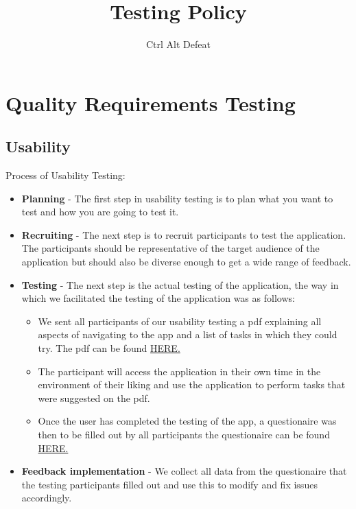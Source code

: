 \documentclass[12pt]{article}
\title{Testing Policy}
\author{Ctrl Alt Defeat}
\begin{document}

\tableofcontents
\newpage

\newpage
\section{Quality Requirements Testing}
\subsection{Usability}
Process of Usability Testing:
\begin{itemize}
    \item \textbf{Planning} - The first step in usability testing is to plan what you want to test and how you are going to test it.
    \item \textbf{Recruiting} - The next step is to recruit participants to test the application. The participants should be representative of the target audience of the application but should also be diverse enough to get a wide range of feedback.
    \item \textbf{Testing} - The next step is the actual testing of the application, the way in which we facilitated the testing of the application was as follows:
          \begin{itemize}
              \item We sent all participants of our usability testing a pdf explaining all aspects of navigating to the app and a list of tasks in which they could try. The pdf can be found \href{https://github.com/COS301-SE-2023/Domain-Pulse-A-Sentiment-Analysis-Platform/blob/docs/Demo4Documentation/documentation/Testing%20Policy/Testing_Assistance_Domain_Pulse.pdf}{HERE.}
              \item The participant will access the application in their own time in the environment of their liking and use the application to perform tasks that were suggested on the pdf.
              \item Once the user has completed the testing of the app, a questionaire was then to be filled out by all participants the questionaire can be found \href{https://forms.gle/P6EC4iyg7ZD93LNfA}{HERE.}
          \end{itemize}
    \item \textbf{Feedback implementation} - We collect all data from the questionaire that the testing participants filled out and use this to modify and fix issues accordingly.
\end{itemize}
\end{document}
